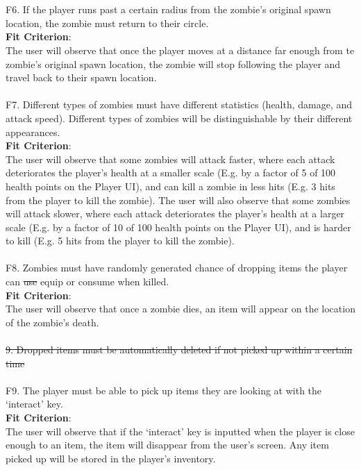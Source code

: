 \documentclass[12pt, titlepage]{article}
\begin{document}
\\\\
{\color{magenta} F6.} If the player runs past a certain radius from the zombie’s original spawn location, the zombie must return to their circle. \\{\color{magenta} \textbf{Fit Criterion}:\\ The user will observe that once the player moves at a distance far enough from te zombie's original spawn location, the zombie will stop following the player and travel back to their spawn location}. 
\\\\
{\color{magenta} F7.} Different types of zombies must have different statistics (health, damage, {\color{magenta} and attack speed). Different types of zombies will be distinguishable by their different appearances. \\
\textbf{Fit Criterion}:\\ The user will observe that some zombies will attack faster, where each attack deteriorates the player's health at a smaller scale (E.g. by a factor of 5 of 100 health points on the Player UI), and can kill a zombie in less hits (E.g. 3 hits from the player to kill the zombie). The user will also observe that some zombies will attack slower, where each attack deteriorates the player's health at a larger scale (E.g. by a factor of 10 of 100 health points on the Player UI), and is harder to kill (E.g. 5 hits from the player to kill the zombie)}.
\\\\
{\color{magenta} F8.} Zombies must have randomly generated chance of dropping items the player can \sout{use} {\color{magenta} equip} or consume when killed. \\
{\color{magenta} \textbf{Fit Criterion}:\\ The user will observe that once a zombie dies, an item will appear on the location of the zombie's death.}
\\\\
\sout{9. Dropped items must be automatically deleted if not picked up within a certain time}
\\\\
{\color{magenta} F9.} The player must be able to pick up items they are looking at with the ‘interact’ key. \\
{\color{magenta} \textbf{Fit Criterion}:\\ The user will observe that if the ‘interact’ key is inputted when the player is close enough to an item, the item will disappear from the user's screen. Any item picked up will be stored in the player's inventory.}
\end{document}
